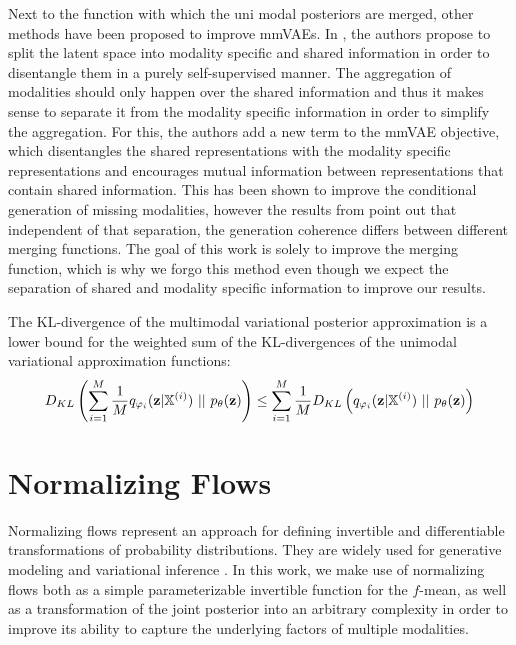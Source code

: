 Next to the function with which the uni modal posteriors are merged, other methods have been proposed to improve mmVAEs.
In \cite{daun_disent}, the authors propose to split the latent space into modality specific and shared information in order to disentangle them in a purely self-supervised manner.
The aggregation of modalities should only happen over the shared information and thus it makes sense to separate it from the modality specific information in order to simplify the aggregation.
For this, the authors add a new term to the mmVAE objective, which disentangles the shared representations with the modality specific representations and encourages mutual information between representations that contain shared information.
This has been shown to improve the conditional generation of missing modalities, however the results from \cite{sutter_multimodal_2020} point out that independent of that separation, the generation coherence differs between different merging functions.
The goal of this work is solely to improve the merging function, which is why we forgo this method even though we expect the separation of shared and modality specific information to improve our results.


\begin{lemma}
    \label{lemma:DklLowerBound}

    The KL-divergence of the multimodal variational posterior approximation is a lower bound for the weighted sum of the KL-divergences of the unimodal variational approximation functions:
    \begin{equation}
        D_{KL} \left( \sum _{i=1} ^M \frac{1}{M}q_{\varphi_i}(\textbf{z}|\mathbb{X}^{(i)})\ ||\ p_{\theta}(\textbf{z}) \right) \leq \sum _{i=1} ^M \frac{1}{M} D_{KL} \left( q_{\varphi_i}(\textbf{z}|\mathbb{X}^{(i)})\ ||\ p_{\theta}(\textbf{z}) \right)
    \end{equation}
\end{lemma}


\section{Normalizing Flows}
\label{subsec: Normalizing Flows}
Normalizing flows \parencite{papamakarios_normalizing_2019} represent an approach for defining invertible and differentiable transformations of probability distributions.
They are widely used for generative modeling \citep[\textbf{GLOW}, \textbf{Real NVP}]{kingma_glow_2018, dinh_density_2017} and variational inference \parencite{rezende_variational_2016, berg_sylvester_2019}.
In this work, we make use of normalizing flows both as a simple parameterizable invertible function for the $f$-mean, as well as a transformation of the joint posterior into an arbitrary complexity in order to improve its ability to capture the underlying factors of multiple modalities.

